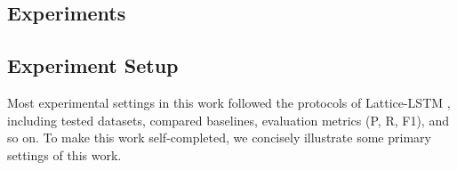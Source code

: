\documentclass[11pt,a4paper]{article}
\begin{document}
\begin{CJK}{UTF8}{gbsn}
\section{Experiments} \label{sec:experiment}




\subsection{Experiment Setup}
Most experimental settings in this work followed the protocols of Lattice-LSTM \cite{zhang2018chinese}, including tested datasets, compared baselines, evaluation metrics (P, R, F1), and so on. To make this work self-completed, we concisely illustrate some primary settings of this work. 


\begin{table}[h!]
    \centering
    \caption{Inference speed (average sentences per second, the larger the better) of our method with LSTM layer compared with Lattice-LSTM, LR-CNN and BERT.}
    \label{tab:speed}
\end{table}


\end{CJK}
\end{document}
